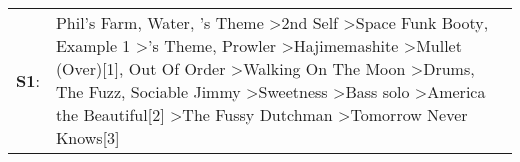 \begin{supertabular}{p{0.03\textwidth}p{0.92\textwidth}}
 \textbf{S1}:  &  Phil's Farm\textsuperscript{}, \enspace Water\textsuperscript{}, 's Theme\textsuperscript{} \textgreater \enspace 2nd Self\textsuperscript{} \textgreater \enspace Space Funk Booty\textsuperscript{}, \enspace Example 1\textsuperscript{} \textgreater {}'s Theme\textsuperscript{}, \enspace Prowler\textsuperscript{} \textgreater \enspace Hajimemashite\textsuperscript{} \textgreater \enspace Mullet (Over)[1]\textsuperscript{}, \enspace Out Of Order\textsuperscript{} \textgreater \enspace Walking On The Moon\textsuperscript{} \textgreater \enspace Drums\textsuperscript{}, \enspace The Fuzz\textsuperscript{}, \enspace Sociable Jimmy\textsuperscript{} \textgreater \enspace Sweetness\textsuperscript{} \textgreater \enspace Bass solo\textsuperscript{} \textgreater \enspace America the Beautiful[2]\textsuperscript{} \textgreater \enspace The Fussy Dutchman\textsuperscript{} \textgreater \enspace Tomorrow Never Knows[3]\textsuperscript{}  \enspace  \\
\end{supertabular}
